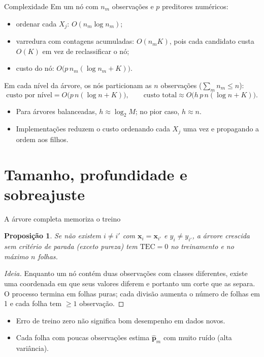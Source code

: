 \documentclass[aspectratio=169]{beamer}
\newtheorem{proposition}[theorem]{Proposição}
\newcommand{\TEC}{\mathrm{TEC}}
\begin{document}
\begin{frame}{Complexidade}
Em um nó com $n_m$ observações e $p$ preditores numéricos:
\begin{itemize}
  \item ordenar cada $X_j$: $O(n_m\log n_m)$;
  \item varredura com contagens acumuladas: $O(n_m K)$, pois cada candidato custa $O(K)$ em vez de reclassificar o nó;
  \item custo do nó: $O\bigl(p\,n_m(\log n_m+K)\bigr)$.
\end{itemize}
\vspace{4pt}
Em cada nível da árvore, os nós particionam as $n$ observações ($\sum_m n_m\le n$):
\[
\text{custo por nível}=O\bigl(p\,n(\log n+K)\bigr),
\qquad
\text{custo total}\approx O\bigl(h\,p\,n(\log n+K)\bigr).
\]
\begin{itemize}
  \item Para árvores balanceadas, $h\approx\log_2 M$; no pior caso, $h\approx n$.
  \item Implementações reduzem o custo ordenando cada $X_j$ \alert{uma vez} e propagando a ordem aos filhos.
\end{itemize}
\end{frame}

\section{Tamanho, profundidade e sobreajuste}\label{sec:overfit}

\begin{frame}{A árvore completa memoriza o treino}
\begin{proposition}
Se não existem $i\ne i'$ com $\mathbf x_i=\mathbf x_{i'}$ e $y_i\ne y_{i'}$, a árvore crescida sem critério de parada (exceto pureza) tem $\TEC=0$ no treinamento e no máximo $n$ folhas.
\end{proposition}
\begin{proof}[Ideia]
Enquanto um nó contém duas observações com classes diferentes, existe uma coordenada em que seus valores diferem e portanto um corte que as separa. O processo termina em folhas puras; cada divisão aumenta o número de folhas em 1 e cada folha tem $\ge1$ observação.
\end{proof}
\begin{itemize}
  \item Erro de treino zero \alert{não} significa bom desempenho em dados novos.
  \item Cada folha com poucas observações estima $\hat{\mathbf p}_m$ com muito ruído (alta variância).
\end{itemize}
\end{frame}
\end{document}
